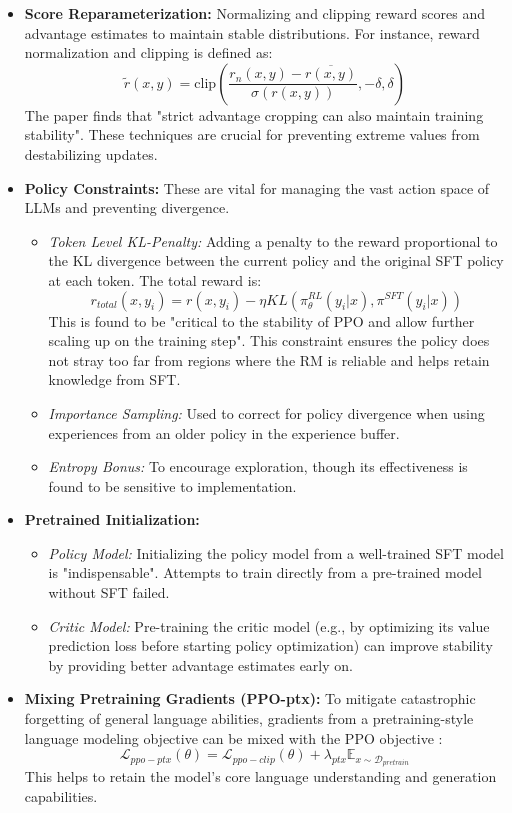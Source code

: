 \documentclass[10pt,journal,compsoc]{IEEEtran} %
\begin{document}
\begin{itemize}
    \item \textbf{Score Reparameterization:} Normalizing and clipping reward scores and advantage estimates to maintain stable distributions. For instance, reward normalization and clipping is defined as:
    $$ \tilde{r}(x,y)=\text{clip}\left(\frac{r_{n}(x,y)-\overline{r(x,y)}}{\sigma(r(x,y))},-\delta,\delta\right) $$
    The paper finds that "strict advantage cropping can also maintain training stability". \cite{Zheng2023PPO} These techniques are crucial for preventing extreme values from destabilizing updates.
    \item \textbf{Policy Constraints:} These are vital for managing the vast action space of LLMs and preventing divergence.
        \begin{itemize}
            \item \textit{Token Level KL-Penalty:} Adding a penalty to the reward proportional to the KL divergence between the current policy and the original SFT policy at each token. The total reward is:
            $$ r_{total}(x,y_i) = r(x,y_i) - \eta KL(\pi_\theta^{RL}(y_i|x),\pi^{SFT}(y_i|x)) $$
            This is found to be "critical to the stability of PPO and allow further scaling up on the training step". \cite{Zheng2023PPO} This constraint ensures the policy does not stray too far from regions where the RM is reliable and helps retain knowledge from SFT.
            \item \textit{Importance Sampling:} Used to correct for policy divergence when using experiences from an older policy in the experience buffer.
            \item \textit{Entropy Bonus:} To encourage exploration, though its effectiveness is found to be sensitive to implementation.
        \end{itemize}
    \item \textbf{Pretrained Initialization:}
        \begin{itemize}
            \item \textit{Policy Model:} Initializing the policy model from a well-trained SFT model is "indispensable". \cite{Zheng2023PPO} Attempts to train directly from a pre-trained model without SFT failed.
            \item \textit{Critic Model:} Pre-training the critic model (e.g., by optimizing its value prediction loss before starting policy optimization) can improve stability by providing better advantage estimates early on. \cite{Zheng2023PPO}
        \end{itemize}
    \item \textbf{Mixing Pretraining Gradients (PPO-ptx):} To mitigate catastrophic forgetting of general language abilities, gradients from a pretraining-style language modeling objective can be mixed with the PPO objective \cite{Zheng2023PPO}:
    $$ \mathcal{L}_{ppo-ptx}(\theta)=\mathcal{L}_{ppo-clip}(\theta)+\lambda_{ptx}\mathbb{E}_{x\sim\mathcal{D}_{pretrain}} $$
    This helps to retain the model's core language understanding and generation capabilities.
\end{itemize}
\end{document}
